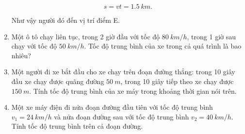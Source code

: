 \begin{enumerate}[label=\bfseries Bài \arabic*:,leftmargin=1.5cm]
{		$$s = vt = \SI{1,5}{km}.$$ 
		
		Như vậy người đó đến vị trí điểm E.
	}

	
	\item {}
	
	{
		
		Một ô tô chạy liên tục, trong 2 giờ đầu với tốc độ $\SI{80}{km/h}$, trong 1 giờ sau chạy với tốc độ $\SI{50}{km/h}$. Tốc độ trung bình của xe trong cả quá trình là bao nhiêu?
	}

\item {}

{
	
	Một người đi xe bắt đầu cho xe chạy trên đoạn đường thẳng: trong 10 giây đầu xe chạy được quãng đường $\SI{50}{m}$, trong 10 giây tiếp theo xe chạy được $\SI{150}{m}$. Tính tốc độ trung bình của xe máy trong khoảng thời gian nói trên.
}

	\item {}

{
	Một xe máy điện đi nửa đoạn đường đầu tiên với tốc độ trung bình $v_1 = \SI{24}{km/h}$ và nửa đoạn đường sau với tốc độ trung bình $v_2 = \SI{40}{km/h}$. Tính tốc độ trung bình trên cả đoạn đường.
	
}
\end{enumerate}
